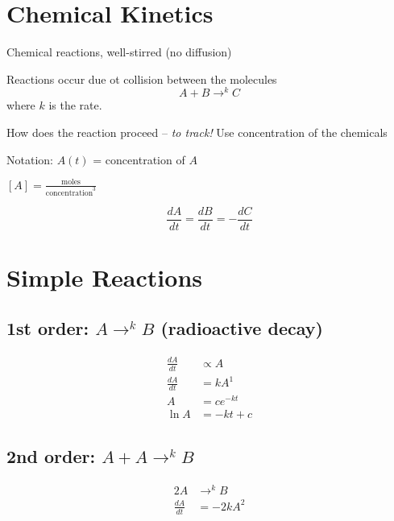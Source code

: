 \documentclass[
	date={October 14{,} 2024},
	month={10},
	day={14}
]{math486notes}
\begin{document}
\tableofcontents

\section{Chemical Kinetics}\label{sec:chemical-kinetics}
Chemical reactions, well-stirred (no diffusion)

Reactions occur due ot collision between the molecules
\[ A + B \rightarrow^{k} C \]
where $k$ is the rate.

How does the reaction proceed -- \emph{to track!}
Use concentration of the chemicals

Notation: $A(t)$ = concentration of $A$

$[A] = \frac{\mbox{moles}}{\mbox{concentration}^{3}}$

\begin{equation}
	\frac{dA}{dt} = \frac{dB}{dt} = -\frac{dC}{dt}
	\label{eq:reaction-rate}
\end{equation}

\section{Simple Reactions}\label{sec:simple-reactions}
\subsection{1st order: $A \rightarrow^{k} B$ (radioactive decay)}\label{subsec:1st-order-reaction}
\begin{equation*}
\begin{aligned}
	\frac{dA}{dt} &\propto A\\
	\frac{dA}{dt} &= kA^{1}\\
	A &= ce^{-kt}\\
	\ln A &= -kt + c
\end{aligned}
\end{equation*}

\subsection{2nd order: $A + A \rightarrow^{k} B$}\label{subsec:2nd-order-reaction}
\begin{equation*}
\begin{aligned}
	2A &\rightarrow^{k} B\\
	\frac{dA}{dt} &= -2kA^{2}\\
\end{aligned}
\end{equation*}
\end{document}

